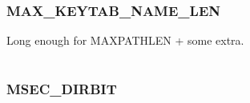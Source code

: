 \documentclass[letterpaper,10pt,english]{sphinxmanual}
\begin{document}
\begin{fulllineitems}
\label{appdev/refs/macros/LR_TYPE_THIS_SERVER_ONLY:LR_TYPE_THIS_SERVER_ONLY}
\end{fulllineitems}


\begin{tabulary}{\linewidth}{|L|L|}
\hline

 & 
\\\hline
\end{tabulary}



\subsubsection{MAX\_KEYTAB\_NAME\_LEN}
\label{appdev/refs/macros/MAX_KEYTAB_NAME_LEN:max-keytab-name-len-data}\label{appdev/refs/macros/MAX_KEYTAB_NAME_LEN::doc}\label{appdev/refs/macros/MAX_KEYTAB_NAME_LEN:max-keytab-name-len}

\begin{fulllineitems}
\label{appdev/refs/macros/MAX_KEYTAB_NAME_LEN:MAX_KEYTAB_NAME_LEN}
\end{fulllineitems}


Long enough for MAXPATHLEN + some extra.

\begin{tabulary}{\linewidth}{|L|L|}
\hline

 & 
\\\hline
\end{tabulary}



\subsubsection{MSEC\_DIRBIT}
\label{appdev/refs/macros/MSEC_DIRBIT:msec-dirbit}\label{appdev/refs/macros/MSEC_DIRBIT:msec-dirbit-data}\label{appdev/refs/macros/MSEC_DIRBIT::doc}

\begin{fulllineitems}
\label{appdev/refs/macros/MSEC_DIRBIT:MSEC_DIRBIT}
\end{fulllineitems}


\begin{tabulary}{\linewidth}{|L|L|}
\hline

 & 
\\\hline
\end{tabulary}
\end{document}
